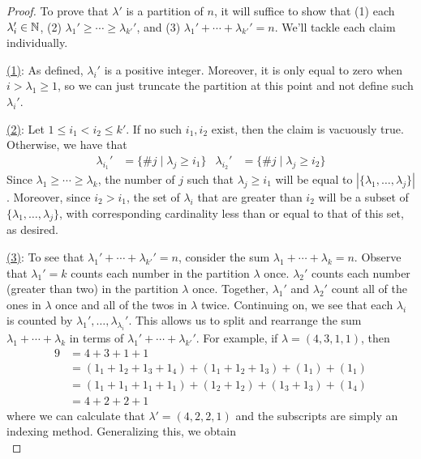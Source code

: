 \documentclass[../psets.tex]{subfiles}
\begin{document}
\begin{enumerate}
\begin{proof}
        To prove that $\lambda'$ is a partition of $n$, it will suffice to show that (1) each $\lambda_i'\in\mathbb{N}$, (2) $\lambda_1'\geq\cdots\geq\lambda_{k'}'$, and (3) $\lambda_1'+\cdots+\lambda_{k'}'=n$. We'll tackle each claim individually.\par
        \underline{(1)}: As defined, $\lambda_i'$ is a positive integer. Moreover, it is only equal to zero when $i>\lambda_1\geq 1$, so we can just truncate the partition at this point and not define such $\lambda_i'$.\par
        \underline{(2)}: Let $1\leq i_1<i_2\leq k'$. If no such $i_1,i_2$ exist, then the claim is vacuously true. Otherwise, we have that
        \begin{align*}
            \lambda_{i_1}' &= \{\#j\mid\lambda_j\geq i_1\}&
            \lambda_{i_2}' &= \{\#j\mid\lambda_j\geq i_2\}
        \end{align*}
        Since $\lambda_1\geq\cdots\geq\lambda_k$, the number of $j$ such that $\lambda_j\geq i_1$ will be equal to $|\{\lambda_1,\dots,\lambda_j\}|$. Moreover, since $i_2>i_1$, the set of $\lambda_i$ that are greater than $i_2$ will be a subset of $\{\lambda_1,\dots,\lambda_j\}$, with corresponding cardinality less than or equal to that of this set, as desired.\par
        \underline{(3)}: To see that $\lambda_1'+\cdots+\lambda_{k'}'=n$, consider the sum $\lambda_1+\cdots+\lambda_k=n$. Observe that $\lambda_1'=k$ counts each number in the partition $\lambda$ once. $\lambda_2'$ counts each number (greater than two) in the partition $\lambda$ once. Together, $\lambda_1'$ and $\lambda_2'$ count all of the ones in $\lambda$ once and all of the twos in $\lambda$ twice. Continuing on, we see that each $\lambda_i$ is counted by $\lambda_1',\dots,\lambda_{\lambda_i}'$. This allows us to split and rearrange the sum $\lambda_1+\cdots+\lambda_k$ in terms of $\lambda_1'+\cdots+\lambda_{k'}'$. For example, if $\lambda=(4,3,1,1)$, then
        \begin{align*}
            9 &= 4+3+1+1\\
            &= (1_1+1_2+1_3+1_4)+(1_1+1_2+1_3)+(1_1)+(1_1)\\
            &= (1_1+1_1+1_1+1_1)+(1_2+1_2)+(1_3+1_3)+(1_4)\\
            &= 4+2+2+1
        \end{align*}
        where we can calculate that $\lambda'=(4,2,2,1)$ and the subscripts are simply an indexing method. Generalizing this, we obtain
        \begin{equation*}

\end{equation*}
\end{proof}
\end{enumerate}
\end{document}
